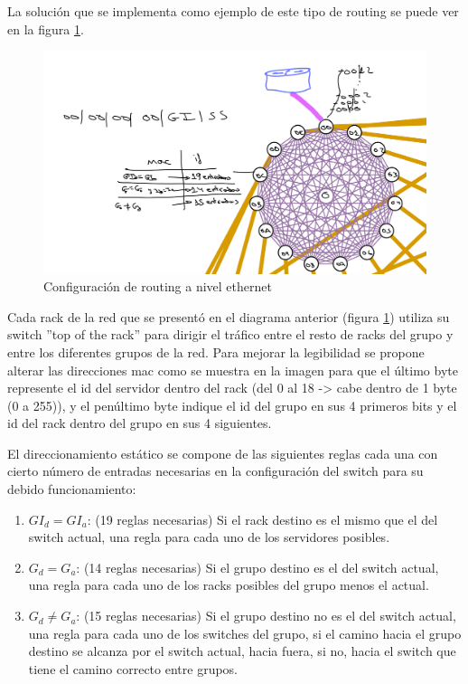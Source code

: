\documentclass[%
    school=etsisi,%
    degree=61TI,%
]{upm-report}
\begin{document}
La solución que se implementa como ejemplo de este tipo de routing se puede ver en la figura \ref{fig:ethernet-routing}.

\begin{figure}
    \centering
    \includegraphics[width=1.0\textwidth]{figures/routing-ethernet.png}
    \caption{\label{fig:ethernet-routing} Configuración de routing a nivel ethernet}
\end{figure}

Cada rack de la red que se presentó en el diagrama anterior (figura \ref{fig:ethernet-routing}) utiliza su switch ''top of the rack'' para dirigir el tráfico entre el resto de racks del grupo y entre los diferentes grupos de la red. Para mejorar la legibilidad se propone alterar las direcciones mac como se muestra en la imagen para que el último byte represente el id del servidor dentro del rack (del 0 al 18 -> cabe dentro de 1 byte (0 a 255)), y el penúltimo byte indique el id del grupo en sus 4 primeros bits y el id del rack dentro del grupo en sus 4 siguientes.

El direccionamiento estático se compone de las siguientes reglas cada una con cierto número de entradas necesarias en la configuración del switch para su debido funcionamiento:

\begin{enumerate}
    \item $GI_d = GI_a$: (19 reglas necesarias) Si el rack destino es el mismo que el del switch actual, una regla  para cada uno de los servidores posibles.
    \item $G_d = G_a$: (14 reglas necesarias) Si el grupo destino es el del switch actual, una regla para cada uno de los racks posibles del grupo menos el actual.
    \item $G_d \neq G_a$: (15 reglas necesarias) Si el grupo destino no es el del switch actual, una regla para cada uno de los switches del grupo, si el camino hacia el grupo destino se alcanza por el switch actual, hacia fuera, si no, hacia el switch que tiene el camino correcto entre grupos.
\end{enumerate}
\end{document}
